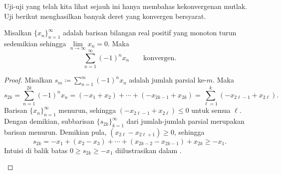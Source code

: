 Uji-uji yang telah kita lihat sejauh ini hanya membahas kekonvergenan mutlak.  Uji
berikut menghasilkan banyak deret yang konvergen bersyarat.

\begin{prop}
Misalkan $\{ x_n \}_{n=1}^\infty$ adalah barisan bilangan real positif yang monoton turun sedemikian
sehingga $\lim\limits_{n\to\infty} x_n = 0$.  Maka
\begin{equation*}
\sum_{n=1}^\infty {(-1)}^n x_n \qquad \text{konvergen.}
\end{equation*}
\end{prop}

\begin{proof}
Misalkan $s_m \coloneqq \sum_{n=1}^m {(-1)}^n x_n$ adalah jumlah parsial ke-$m$.  Maka
\begin{equation*}
s_{2k} =
\sum_{n=1}^{2k} {(-1)}^n x_n
=
(-x_1 + x_2) + \cdots + (-x_{2k-1} + x_{2k})
=
\sum_{\ell=1}^{k} (-x_{2\ell-1} + x_{2\ell}) .
\end{equation*}
Barisan $\{ x_n \}_{n=1}^\infty$ menurun, sehingga $(-x_{2\ell-1}+x_{2\ell}) \leq 0$
untuk semua $\ell$.
Dengan demikian, subbarisan $\{ s_{2k} \}_{k=1}^\infty$ dari jumlah-jumlah parsial
merupakan barisan menurun.  Demikian pula, $(x_{2\ell}-x_{2\ell+1}) \geq 0$, sehingga
\begin{equation*}
s_{2k} = - x_1 + ( x_2 - x_3 ) + \cdots + ( x_{2k-2} - x_{2k-1} ) + x_{2k}
\geq -x_1 .
\end{equation*}
Intuisi di balik batas
$0 \geq s_{2k} \geq -x_1$ diilustrasikan dalam .
\begin{myfigureht}
\caption{Menunjukkan bahwa $0 \geq s_{2k} \geq -x_1$ dengan $k=4$ untuk suatu deret berselang-seling.\label{fig:seralternate}}
\end{myfigureht}


\end{proof}

